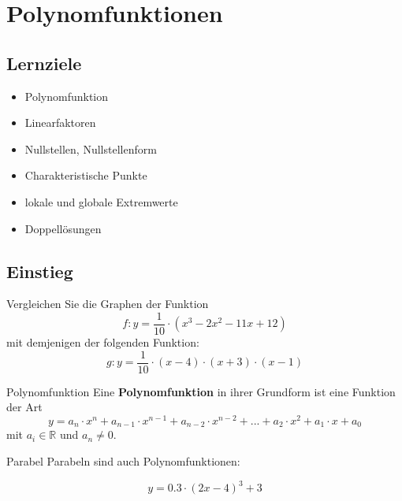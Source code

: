 
\section{Polynomfunktionen}

\subsection*{Lernziele}

\begin{itemize}
\item Polynomfunktion
\item Linearfaktoren
\item Nullstellen, Nullstellenform
\item Charakteristische Punkte
\item lokale und globale Extremwerte
\item Doppellösungen
\end{itemize}

\newpage

\subsection{Einstieg}
Vergleichen Sie die Graphen der Funktion
$$f: y= \frac1{10}\cdot{}(x^3-2x^2-11x+12)$$
mit demjenigen der folgenden Funktion:
$$g: y=\frac1{10}\cdot{}(x-4)\cdot{}(x+3)\cdot{}(x-1)$$



\newpage
\begin{definition}{Polynomfunktion}{}
  Eine \textbf{Polynomfunktion} in ihrer Grundform ist eine Funktion
  der Art
  $$y = a_n\cdot{}x^n + a_{n-1}\cdot{}x^{n-1} + a_{n-2}\cdot{}x^{n-2}
  + ... + a_2\cdot{}x^2 + a_1\cdot{}x + a_0$$
  mit $a_i\in \mathbb{R}$ und $a_n\ne 0$.
\end{definition}

\begin{bemerkung}{Parabel}{}
  Parabeln sind auch Polynomfunktionen:

  $$y  = 0.3\cdot{}(2x-4)^3 + 3$$
  
\end{bemerkung}




